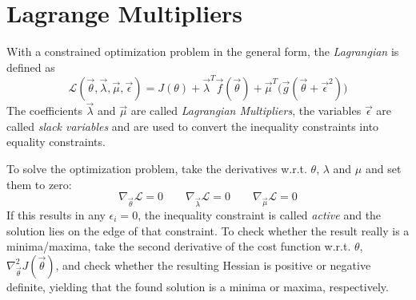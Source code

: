	\section{Lagrange Multipliers}
		With a constrained optimization problem in the general form, the \emph{Lagrangian} is defined as
		\begin{equation}
			\mathcal{L}(\vec{\theta}, \vec{\lambda}, \vec{\mu}, \vec{\epsilon}) = J(\theta) + \vec{\lambda}^T\vec{f}(\vec{\theta}) + \vec{\mu}^T \big(\vec{g}(\vec{\theta} + \vec{\epsilon}^2)\big)
		\end{equation}
		The coefficients \(\vec{\lambda}\) and \( \vec{\mu} \) are called \emph{Lagrangian Multipliers}, the variables \( \vec{\epsilon} \) are called \emph{slack variables} and are used to convert the inequality constraints into equality constraints.

		To solve the optimization problem, take the derivatives w.r.t. \( \theta \), \(\lambda\) and \(\mu\) and set them to zero:
		\begin{equation}
			\nabla_{\vec{\theta}} \mathcal{L} = 0 \qquad \nabla_{\vec{\lambda}} \mathcal{L} = 0 \qquad \nabla_{\vec{\mu}} \mathcal{L} = 0
		\end{equation}
		If this results in any \( \epsilon_i = 0 \), the inequality constraint is called \emph{active} and the solution lies on the edge of that constraint. To check whether the result really is a minima/maxima, take the second derivative of the cost function w.r.t. \(\theta\), \( \nabla_{\vec{\theta}}^2 J(\vec{\theta}) \), and check whether the resulting Hessian is positive or negative definite, yielding that the found solution is a minima or maxima, respectively.


